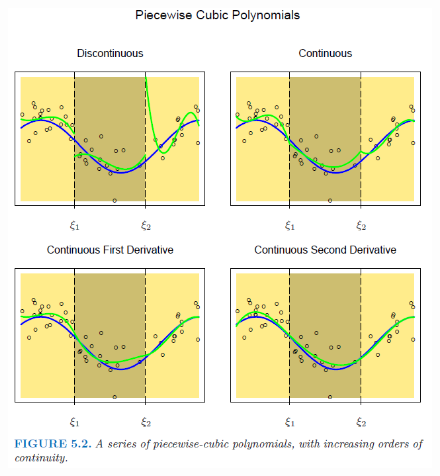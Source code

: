  
\begin{frame}
  \begin{figure}[htbp]
  \begin{center}
  \includegraphics[height=\textheight]{./resources/ESLPiecewiseCubic}
  \end{center}
  \end{figure}
\end{frame}

